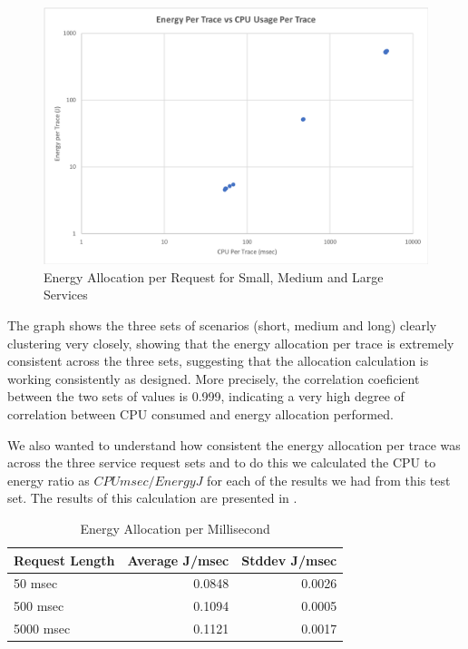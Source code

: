 \begin{figure}
\centering
\includegraphics[width=1.0\textwidth]{Figures/validation-energycpu}
\caption{Energy Allocation per Request for Small, Medium and Large Services}
\label{figure:validation-energycpu}
\end{figure}

The graph shows the three sets of scenarios (short, medium and long) clearly clustering very closely, showing that the energy allocation per trace is extremely consistent across the three sets, suggesting that the allocation calculation is working consistently as designed.  More precisely, the correlation coeficient between the two sets of values is 0.999, indicating a very high degree of correlation between CPU consumed and energy allocation performed.

We also wanted to understand how consistent the energy allocation per trace was across the three service request sets and to do this we calculated the CPU to energy ratio as $CPU msec / Energy J$ for each of the results we had from this test set.  The results of this calculation are presented in .

\begin{table}
\centering
\caption{Energy Allocation per Millisecond}
\label{table:energypermsec}
\footnotesize
\begin{tabular}{|l|r|r|}
\hline
\textbf{Request Length} & \textbf{Average J/msec}  & \textbf{Stddev J/msec} \\
\hline
50 msec & 0.0848 & 0.0026 \\
\hline
500 msec & 0.1094 & 0.0005 \\
\hline
5000 msec & 0.1121 & 0.0017 \\
\hline
\end{tabular}
\end{table} 

